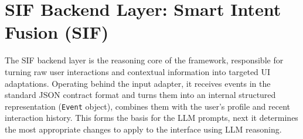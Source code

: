 \documentclass[openany]{book}
\begin{document}
    
\section{SIF Backend Layer: Smart Intent Fusion (SIF)}

The SIF backend layer is the reasoning core of the framework, responsible for turning raw user interactions and contextual information into targeted UI adaptations. Operating behind the input adapter, it receives events in the standard JSON contract format and turns them into an internal structured representation (\texttt{Event} object), combines them with the user’s profile and recent interaction history. This forms the basis for the LLM prompts, next it determines the most appropriate changes to apply to the interface using LLM reasoning.
\end{document}
